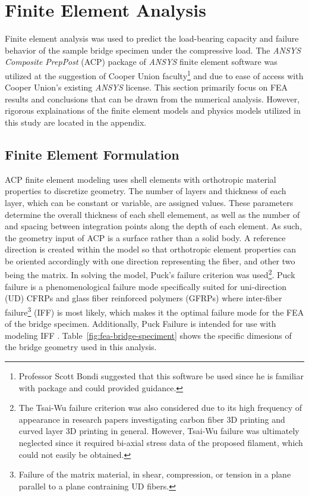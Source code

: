 \section{Finite Element Analysis}

\indent

Finite element analysis was used to predict the load-bearing capacity and failure behavior of the sample bridge specimen under the compressive load. The \textit{ANSYS Composite PrepPost} (ACP) package of \textit{ANSYS} finite element software was utilized at the suggestion of Cooper Union faculty\footnote{Professor Scott Bondi suggested that this software be used since he is familiar with package and could provided guidance.} and due to ease of access with Cooper Union's existing \textit{ANSYS} license. This section primarily focus on FEA results and conclusions that can be drawn from the numerical analysis. However, rigorous explainations of the finite element models and physics models utilized in this study are located in the appendix.\\

\subsection{Finite Element Formulation}

\indent

ACP finite element modeling uses shell elements with orthotropic material properties to discretize geometry. The number of layers and thickness of each layer, which can be constant or variable, are assigned values. These parameters determine the overall thickness of each shell elemement, as well as the number of and spacing between integration points along the depth of each element. As such, the geometry input of ACP is a surface rather than a solid body. A reference direction is created within the model so that orthotropic element properties can be oriented accordingly with one direction representing the fiber, and other two being the matrix. In solving the model, Puck's failure criterion was used\footnote{The Tsai-Wu failure criterion was also considered due to its high frequency of appearance in research papers investigating carbon fiber 3D printing and curved layer 3D printing in general. However, Tsai-Wu failure was ultimately neglected since it required bi-axial stress data of the proposed filament, which could not easily be obtained.}. Puck failure is a phenomenological failure mode specifically suited for uni-direction (UD) CFRPs and glass fiber reinforced polymers (GFRPs) where inter-fiber failure\footnote{Failure of the matrix material, in shear, compression, or tension in a plane parallel to a plane contraining UD fibers.} (IFF) is most likely, which makes it the optimal failure mode for the FEA of the bridge specimen. Additionally, Puck Failure is intended for use with modeling IFF \cite{Puck-Stuttgard} \cite{Puck-NASA}. Table~\ref{fig:fea-bridge-speciment} shows the specific dimesions of the bridge geometry used in this analysis.\\

